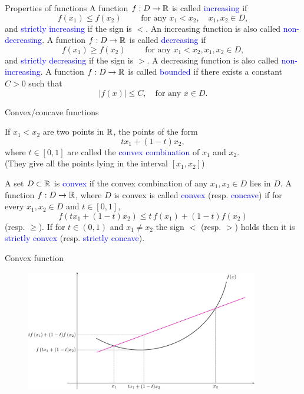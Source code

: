 \documentclass[11pt,aspectratio=169]{beamer}
\begin{document}
\begin{frame}{
Properties of functions}
A function $f:D \rightarrow \mathbb R$ is called \textcolor{blue}{increasing} if 
$$
f(x_1)\leq f(x_2) \qquad \text{ for any } x_1<x_2,\quad  x_1,x_2 \in D,
$$
 and \textcolor{blue}{strictly increasing} if the sign is $<$. An increasing function is also called \textcolor{blue}{non-decreasing}.
\vskip 12pt
 A function $f:D \rightarrow \mathbb R$ is called \textcolor{blue}{decreasing} if $$
f(x_1)\geq f(x_2) \qquad \text{ for any } x_1<x_2, x_1,x_2 \in D,
$$ and \textcolor{blue}{strictly decreasing} if the sign is $>$.
A decreasing function is also called \textcolor{blue}{non-increasing}.
\vskip 12pt
 A function $f:D \rightarrow \mathbb R$ is called \textcolor{blue}{bounded} if there exists a constant $C>0$ such that
$$\vert f(x) \vert \leq C,\quad \text{for any } x \in D.$$ 
\end{frame}

\begin{frame}{Convex/concave functions}

If $x_1<x_2$ are two points in $\mathbb R$, the points of the form 
$$t x_1+(1-t)x_2,$$ where $t \in [0,1]$ are called the \textcolor{blue}{convex combination} of $x_1$ and $x_2$.\\ {\scriptsize (They give all the points lying in the interval $[x_1,x_2]$)}

\vskip 12pt
A set $D\subset \mathbb R$ is \textcolor{blue}{convex} if the convex combination of any $x_1,x_2 \in D$ lies in $D$.
\vskip 12pt
A function $f:D \rightarrow \mathbb R$, where $D$ is convex is called \textcolor{blue}{convex} (resp. \textcolor{blue}{concave}) if for every  $x_1,x_2 \in D$ and $t \in [0,1]$, 
$$f(t x_1+(1-t)x_2)\leq t\, f(x_1)+(1-t) f(x_2)$$
(resp. $\geq$). If for $t \in (0,1)$ and $x_1 \neq x_2$ the sign $<$ (resp. $>$) holds then it is \textcolor{blue}{strictly convex} (resp. \textcolor{blue}{strictly concave}).
\end{frame}

\begin{frame}{Convex function}

\begin{figure}
\includegraphics[width=4in]{img/convex} 
\end{figure}\end{frame}
\end{document}
